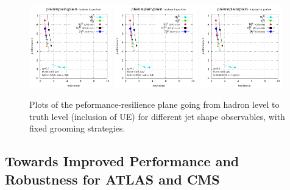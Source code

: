 \documentclass[11pt,letterpaper]{article}
\begin{document}
\begin{figure}
  \includegraphics[width=0.32\textwidth,page=62]{figures/shape-scan-levels.pdf}
  \hfill
  \includegraphics[width=0.32\textwidth,page=56]{figures/shape-scan-levels.pdf}
  \hfill
  \includegraphics[width=0.32\textwidth,page=50]{figures/shape-scan-levels.pdf}
  \caption{Plots of the peformance-resilience plane going from hadron level to truth level (inclusion of UE) for different jet shape observables, with fixed grooming strategies.}\label{fig:shapes-UE}
\end{figure}







\subsection{Towards Improved Performance and Robustness for ATLAS and CMS}\label{sec:exp_compare}

\end{document}
